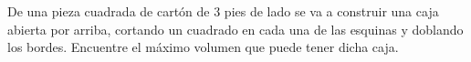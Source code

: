 \item De una pieza cuadrada de cartón de 3 pies de lado se va a construir una caja abierta por arriba, cortando un cuadrado en cada una de las esquinas y doblando los bordes. Encuentre el máximo volumen que puede tener dicha caja.
